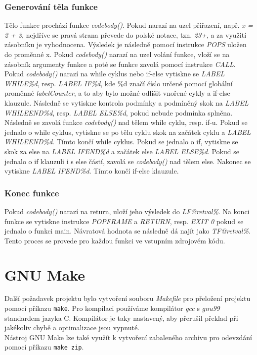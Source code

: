 \documentclass[a4paper, 12pt]{article}
\begin{document}
\subsubsection{Generování těla funkce}
Tělo funkce prochází funkce \textit{codebody()}. Pokud narazí na uzel přiřazení, např. \textit{x = 2 + 3}, nejdříve se pravá strana převede do polské notace, tzn. \textit{23+}, a za využití zásobníku je vyhodnocena. Výsledek je následně pomocí instrukce \textit{POPS} uložen do proměnné x. Pokud \textit{codebody()} narazí na uzel volání funkce, vloží se na zásobník argumenty funkce a poté se funkce zavolá pomocí instrukce \textit{CALL}. Pokud \textit{codebody()} narazí na while cyklus nebo if-else vytiskne se \textit{LABEL WHILE\%d}, resp. \textit{LABEL IF\%d}, kde \%d značí číslo určené pomocí globální proměnné \textit{labelCounter}, a to aby bylo možné odlišit vnořené cykly a if-else klauzule. Následně se vytiskne kontrola podmínky a podmíněný skok na \textit{LABEL WHILEEND\%d}, resp. \textit{LABEL ELSE\%d}, pokud nebude podmínka splněna. Následně se zavolá funkce \textit{codebody()} nad tělem while cyklu, resp. if-u. Pokud se jednalo o while cyklus, vytiskne se po tělu cyklu skok na začátek cyklu a \textit{LABEL WHILEEND\%d}. Tímto končí while cyklus. Pokud se jednalo o if, vytiskne se skok za else na \textit{LABEL IFEND\%d} a začátek else \textit{LABEL ELSE\%d}. Pokud se jednalo o if klauzuli i s else částí, zavolá se \textit{codebody()} nad tělem else. Nakonec se vytiskne \textit{LABEL IFEND\%d}. Tímto končí if-else klauzule.
\subsubsection{Konec funkce}
Pokud \textit{codebody()} narazí na return, uloží jeho výsledek do \textit{LF@retval\%}. Na konci funkce se vytiskne instrukce \textit{POPFRAME} a \textit{RETURN}, resp. \textit{EXIT 0} pokud se jednalo o funkci main. Návratová hodnota se následně dá najít jako \textit{TF@retval\%}. Tento proces se provede pro každou funkci ve vstupním zdrojovém kódu.

\section{GNU Make}
Další požadavek projektu bylo vytvoření souboru \textit{Makefile} pro přeložení projektu pomocí příkazu \texttt{make}. Pro kompilaci používáme kompilátor \textit{gcc} s \textit{gnu99} standardem jazyka C. Kompilátor je taky nastavený, aby přerušil překlad při jakékoliv chybě a optimalizace jsou vypnuté.\\
Nástroj GNU Make lze také využít k vytvoření zabaleného archivu pro odevzdání pomocí příkazu \texttt{make zip}.
\end{document}
